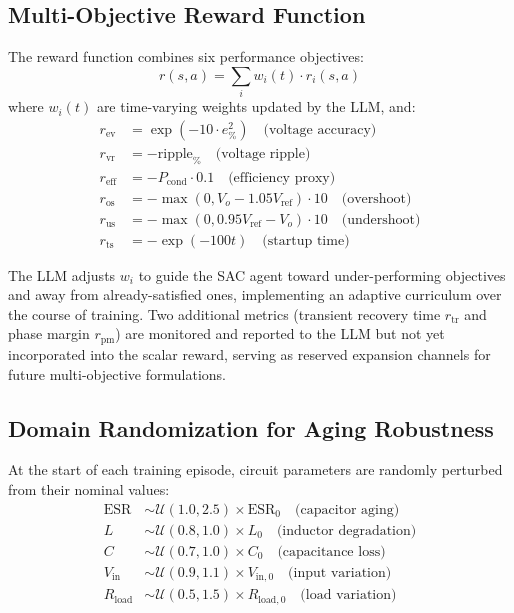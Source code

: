 \documentclass[11pt,a4paper]{article}
\begin{document}
\subsection{Multi-Objective Reward Function}

The reward function combines six performance objectives:
\begin{equation}
    r(s, a) = \sum_{i} w_i(t) \cdot r_i(s, a)
\end{equation}
where $w_i(t)$ are time-varying weights updated by the LLM, and:
\begin{align}
    r_{\text{ev}} &= \exp(-10 \cdot e_{\%}^2) \quad \text{(voltage accuracy)} \\
    r_{\text{vr}} &= -\text{ripple}_{\%} \quad \text{(voltage ripple)} \\
    r_{\text{eff}} &= -P_{\text{cond}} \cdot 0.1 \quad \text{(efficiency proxy)} \\
    r_{\text{os}} &= -\max(0, V_o - 1.05 V_{\text{ref}}) \cdot 10 \quad \text{(overshoot)} \\
    r_{\text{us}} &= -\max(0, 0.95 V_{\text{ref}} - V_o) \cdot 10 \quad \text{(undershoot)} \\
    r_{\text{ts}} &= -\exp(-100 t) \quad \text{(startup time)}
\end{align}

The LLM adjusts $w_i$ to guide the SAC agent toward under-performing objectives
and away from already-satisfied ones, implementing an adaptive curriculum over
the course of training.
Two additional metrics (transient recovery time $r_{\text{tr}}$ and phase margin
$r_{\text{pm}}$) are monitored and reported to the LLM but not yet incorporated
into the scalar reward, serving as reserved expansion channels for future
multi-objective formulations.

\subsection{Domain Randomization for Aging Robustness}

At the start of each training episode, circuit parameters are randomly perturbed
from their nominal values:
\begin{align}
    \text{ESR} &\sim \mathcal{U}(1.0, 2.5) \times \text{ESR}_0 \quad \text{(capacitor aging)} \\
    L &\sim \mathcal{U}(0.8, 1.0) \times L_0 \quad \text{(inductor degradation)} \\
    C &\sim \mathcal{U}(0.7, 1.0) \times C_0 \quad \text{(capacitance loss)} \\
    V_{\text{in}} &\sim \mathcal{U}(0.9, 1.1) \times V_{\text{in},0} \quad \text{(input variation)} \\
    R_{\text{load}} &\sim \mathcal{U}(0.5, 1.5) \times R_{\text{load},0} \quad \text{(load variation)}
\end{align}
\end{document}
